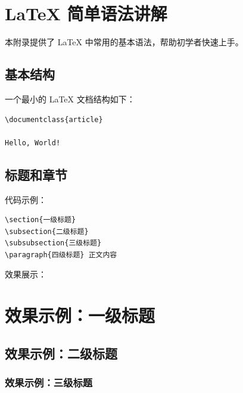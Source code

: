 \section{LaTeX 简单语法讲解}

本附录提供了 LaTeX 中常用的基本语法，帮助初学者快速上手。

\subsection{基本结构}

一个最小的 LaTeX 文档结构如下：

\begin{verbatim}
\documentclass{article}

Hello, World!

\end{verbatim}

\subsection{标题和章节}

代码示例：

\begin{verbatim}
\section{一级标题}
\subsection{二级标题}
\subsubsection{三级标题}
\paragraph{四级标题} 正文内容
\end{verbatim}

效果展示：

\section*{效果示例：一级标题}
\subsection*{效果示例：二级标题}
\subsubsection*{效果示例：三级标题}
